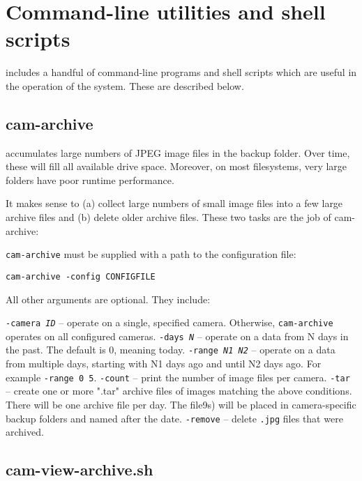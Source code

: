 \clearpage
\section{Command-line utilities and shell scripts}
\label{cli}

  \PRODUCT{} includes a handful of command-line programs and shell
  scripts which are useful in the operation of the system.  These are
  described below.

  \subsection{cam-archive}

    \PRODUCT{} accumulates large numbers of JPEG image files in the
    backup folder.  Over time, these will fill all available drive
    space.  Moreover, on most filesystems, very large folders have
    poor runtime performance.

    It makes sense to (a) collect large numbers of small image files
    into a few large archive files and (b) delete older archive files.
    These two tasks are the job of cam-archive:

    \texttt{cam-archive} must be supplied with a path to the \PRODUCT{}
    configuration file:

    \texttt{cam-archive -config CONFIGFILE}

    All other arguments are optional.  They include:

    \BI
    \I \texttt{-camera \emph{ID}} -- operate on a single, specified
       camera.  Otherwise, \texttt{cam-archive} operates on all configured
       cameras.
    \I \texttt{-days \emph{N}} -- operate on a data from N days in
       the past.  The default is 0, meaning today.
    \I \texttt{-range \emph{N1} \emph{N2}} -- operate on a data from multiple
       days, starting with N1 days ago and until N2 days ago.  For example
       \texttt{-range 0 5}.
    \I \texttt{-count} -- print the number of image files per camera.
    \I \texttt{-tar} -- create one or more ".tar" archive files of images
       matching the above conditions.  There will be one archive file
       per day.  The file9s) will be placed in camera-specific backup
       folders and named after the date.
    \I \texttt{-remove} -- delete \texttt{.jpg} files that were archived.
    \EI

  \subsection{cam-view-archive.sh}

